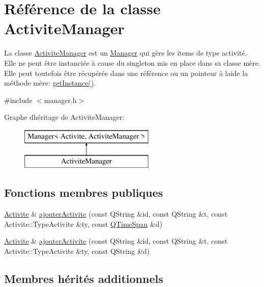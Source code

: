 \hypertarget{class_activite_manager}{}\section{Référence de la classe Activite\+Manager}
\label{class_activite_manager}


La classe \hyperlink{class_activite_manager}{Activite\+Manager} est un \hyperlink{class_manager}{Manager} qui gère les items de type activité. Elle ne peut être instanciée à cause du singleton mis en place dans sa classe mère. Elle peut toutefois être récupérée dans une référence ou un pointeur à l\textquotesingle{}aide la méthode mère\+: \hyperlink{class_manager_a8372e4f1e14f3605a57d839b152325ed}{get\+Instance()}.  




{\ttfamily \#include $<$manager.\+h$>$}

Graphe d\textquotesingle{}héritage de Activite\+Manager\+:\begin{figure}[H]
\begin{center}
\leavevmode
\includegraphics[height=2.000000cm]{class_activite_manager}
\end{center}
\end{figure}
\subsection*{Fonctions membres publiques}
\begin{DoxyCompactItemize}
\item 
\hyperlink{class_activite}{Activite} \& \hyperlink{class_activite_manager_a6c62c6f427c541d44c8da3eef994e562}{ajouter\+Activite} (const Q\+String \&id, const Q\+String \&t, const Activite\+::\+Type\+Activite \&ty, const \hyperlink{class_q_time_span}{Q\+Time\+Span} \&d)
\item 
\hyperlink{class_activite}{Activite} \& \hyperlink{class_activite_manager_a275464cd4fd5b3ca57dfeb10120146d0}{ajouter\+Activite} (const Q\+String \&id, const Q\+String \&t, const Activite\+::\+Type\+Activite \&ty, const Q\+String \&d)
\end{DoxyCompactItemize}
\subsection*{Membres hérités additionnels}


